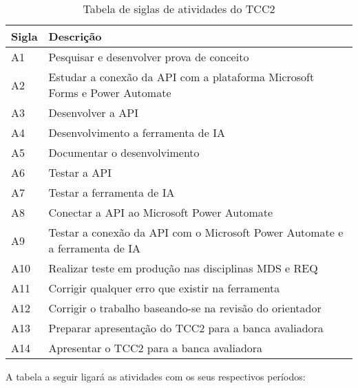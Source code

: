 \begin{table}[!ht]
\centering
\begin{tabularx}{\textwidth}{|X|X|}
\hline
\textbf{Sigla} & \textbf{Descrição} \\
\hline
A1 & Pesquisar e desenvolver prova de conceito \\ \hline
A2 & Estudar a conexão da API com a plataforma Microsoft Forms e Power Automate \\\hline
A3 & Desenvolver a API \\\hline
A4 & Desenvolvimento a ferramenta de IA \\\hline
A5 & Documentar o desenvolvimento \\\hline
A6 & Testar a API \\\hline
A7 & Testar a ferramenta de IA \\\hline
A8 & Conectar a API ao Microsoft Power Automate \\\hline
A9 & Testar a conexão da API com o Microsoft Power Automate e a ferramenta de IA \\\hline
A10 & Realizar teste em produção nas disciplinas MDS e REQ \\\hline
A11 & Corrigir qualquer erro que existir na ferramenta \\\hline
A12 & Corrigir o trabalho baseando-se na revisão do orientador \\\hline
A13 & Preparar apresentação do TCC2 para a banca avaliadora \\\hline
A14 & Apresentar o TCC2 para a banca avaliadora \\\hline
\end{tabularx}
\caption{Tabela de siglas de atividades do TCC2}
\end{table}

\pagebreak

A tabela a seguir ligará as atividades com os seus respectivos períodos:

